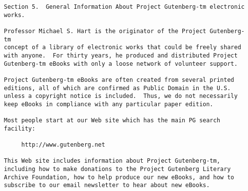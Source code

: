 \begin{Verbatim}[fontsize=\footnotesize]
Section 5.  General Information About Project Gutenberg-tm electronic
works.

Professor Michael S. Hart is the originator of the Project Gutenberg-tm
concept of a library of electronic works that could be freely shared
with anyone.  For thirty years, he produced and distributed Project
Gutenberg-tm eBooks with only a loose network of volunteer support.

Project Gutenberg-tm eBooks are often created from several printed
editions, all of which are confirmed as Public Domain in the U.S.
unless a copyright notice is included.  Thus, we do not necessarily
keep eBooks in compliance with any particular paper edition.

Most people start at our Web site which has the main PG search facility:

     http://www.gutenberg.net

This Web site includes information about Project Gutenberg-tm,
including how to make donations to the Project Gutenberg Literary
Archive Foundation, how to help produce our new eBooks, and how to
subscribe to our email newsletter to hear about new eBooks.
\end{Verbatim}

